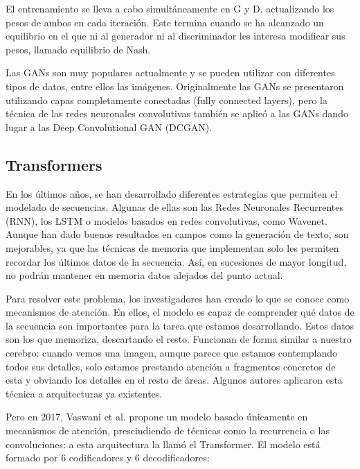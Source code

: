 El entrenamiento se lleva a cabo simultáneamente en G y D, actualizando los pesos de ambos en cada iteración. Este termina cuando se ha alcanzado un equilibrio en el que ni al generador ni al discriminador les interesa modificar sus pesos, llamado equilibrio de Nash.

Las GANs son muy populares actualmente y se pueden utilizar con diferentes tipos de datos, entre ellos las imágenes. Originalmente las GANs se presentaron utilizando capas completamente conectadas (fully connected layers), pero la técnica de las redes neuronales convolutivas también se aplicó a las GANs dando lugar a las Deep Convolutional GAN (DCGAN). \cite{berzal2018redes}

\subsection{Transformers}
En los últimos años, se han desarrollado diferentes estrategias que permiten el modelado de secuencias. Algunas de ellas son las Redes Neuronales Recurrentes (RNN), los LSTM o modelos basados en redes convolutivas, como Wavenet. Aunque han dado buenos resultados en campos como la generación de texto, son mejorables, ya que las técnicas de memoria que implementan solo les permiten recordar los últimos datos de la secuencia. Así, en sucesiones de mayor longitud, no podrán mantener en memoria datos alejados del punto actual.

Para resolver este problema, los investigadores han creado lo que se conoce como mecanismos de atención. En ellos, el modelo es capaz de comprender qué datos de la secuencia son importantes para la tarea que estamos desarrollando. Estos datos son los que memoriza, descartando el resto. Funcionan de forma similar a nuestro cerebro: cuando vemos una imagen, aunque parece que estamos contemplando todos sus detalles, solo estamos prestando atención a fragmentos concretos de esta y obviando los detalles en el resto de áreas. Algunos autores aplicaron esta técnica a arquitecturas ya existentes. 

Pero en 2017, Vaswani et al. \cite{vaswani2017attention} propone un modelo basado únicamente en mecanismos de atención, prescindiendo de técnicas como la recurrencia o las convoluciones: a esta arquitectura la llamó el Transformer. El modelo está formado por 6 codificadores y 6 decodificadores:

